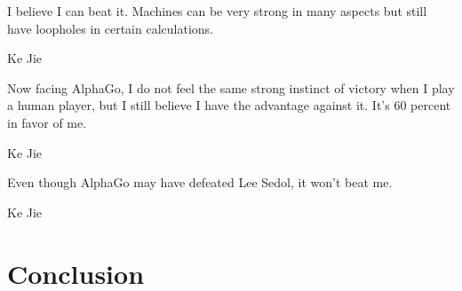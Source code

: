 \documentclass{beamer}
\begin{document}
  {
    \begin{frame}[standout]
      \epigraph{
        \tiny
        I believe I can beat it.
        Machines can be very strong in many aspects but still have loopholes in certain calculations.
      }{Ke Jie}
      \pause

      \epigraph{
        \tiny
        Now facing AlphaGo, I do not feel the same strong instinct of victory when I play a human player, but I still believe I have the advantage against it.
        It's 60 percent in favor of me.
      }{Ke Jie}
      \pause

      \epigraph{
        \tiny
        Even though AlphaGo may have defeated Lee Sedol, it won't beat me.
      }{Ke Jie}
    \end{frame}
  }


  \section{Conclusion}
\end{document}
